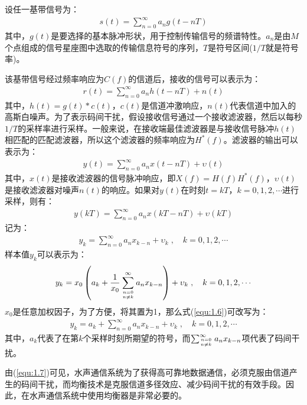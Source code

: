 设任一基带信号为：
\begin{eqnarray}
    s(t)=\sum_{n=0}^{\infty}a_ng(t-nT)
    \label{equ:1.1}
\end{eqnarray}
其中，$g(t)$是要选择的基本脉冲形状，用于控制传输信号的频谱特性。$a_n$是由$M$个点组成的信号星座图中选取的传输信息符号的序列，$T$是符号区间($1/T$就是符号率)。

该基带信号经过频率响应为$C(f)$的信道后，接收的信号可以表示为：
\begin{eqnarray}
    r(t)=\sum_{n=0}^{\infty}a_nh(t-nT)+n(t)
    \label{equ:1.2}
\end{eqnarray}
其中，$h(t)=g(t)*c(t)$，$c(t)$是信道冲激响应，$n(t)$代表信道中加入的高斯白噪声。为了表示码间干扰，假设接收信号通过一个接收滤波器，然后以每秒$1/T$的采样率进行采样。一般来说，在接收端最佳滤波器是与接收信号脉冲$h(t)$相匹配的匹配滤波器，所以这个滤波器的频率响应为$H^*(f)$。滤波器的输出可以表示为：
\begin{eqnarray}
    y(t)=\sum_{n=0}^{\infty}a_nx(t-nT)+\upsilon(t)
    \label{equ:1.3}
\end{eqnarray}
其中，$x(t)$是接收滤波器的信号脉冲响应，即$X(f)=H(f)H^*(f)$，$\upsilon(t)$是接收滤波器对噪声$n(t)$的响应。如果对$y(t)$在时刻$t=kT$，$k=0,1,2,\cdots$进行采样，则有：
\begin{eqnarray}
    y(kT)=\sum_{n=0}^{\infty}a_nx(kT-nT)+\upsilon(kT)
    \label{equ:1.4}
\end{eqnarray}
记为：
\begin{eqnarray}
    y_k=\sum_{n=0}^{\infty}a_nx_{k-n}+\upsilon_k\;,\quad k=0,1,2,\cdots
    \label{equ:1.5}
\end{eqnarray}
样本值$y_k$可以表示为：
\begin{eqnarray}
    y_k=x_0\left(a_k+\frac{1}{x_0}\sum_{n=0 \atop n\neq
    k}^{\infty}a_nx_{k-n}\right)+\upsilon_k\;,\quad k=0,1,2,\cdots
    \label{equ:1.6}
\end{eqnarray}
$x_0$是任意加权因子，为了方便，将其置为1，那么式(\ref{equ:1.6})可改写为：
\begin{eqnarray}
    y_k=a_k+\sum_{n=0}^{\infty}a_nx_{k-n}+\upsilon_k\;,\quad k=0,1,2,\cdots
    \label{equ:1.7}
\end{eqnarray}
其中，$a_k$代表了在第$k$个采样时刻所期望的符号，而$\sum_{n=0\atop n\neq k}^{\infty}a_nx_{k-n}$项代表了码间干扰。

由(\ref{equ:1.7})可见，水声通信系统为了获得高可靠地数据通信，必须克服由信道产生的码间干扰，而均衡技术是克服信道多径效应、减少码间干扰的有效手段。因此，在水声通信系统中使用均衡器是非常必要的。
